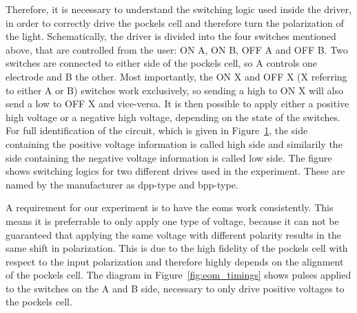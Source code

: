 Therefore, it is necessary to understand the switching logic used inside the driver, in order to correctly drive the pockels cell and therefore turn the polarization of the light. Schematically, the driver is divided into the four switches mentioned above, that are controlled from the user: ON A, ON B, OFF A and OFF B. Two switches are connected to either side of the pockels cell, so A controls one electrode and B the other. Most importantly, the ON X and OFF X (X referring to either A or B) switches work exclusively, so sending a high to ON X will also send a low to OFF X and vice-versa. It is then possible to apply either a positive high voltage or a negative high voltage, depending on the state of the switches. For full identification of the circuit, which is given in Figure~\ref{fig:eom_driver_switches}, the side containing the positive voltage information is called high side and similarily the side containing the negative voltage information is called low side. The figure shows switching logics for two different drives used in the experiment. These are named by the manufacturer as dpp-type and bpp-type.

\begin{figure}[t]
\label{fig:eom_driver_switches}
\end{figure}

A requirement for our experiment is to have the \acp{eom} work consistently. This means it is preferrable to only apply one type of voltage, because it can not be guaranteed that applying the same voltage with different polarity results in the same shift in polarization. This is due to the high fidelity of the pockels cell with respect to the input polarization and therefore highly depends on the alignment of the pockels cell. The diagram in Figure~\ref{fig:eom_timings} shows pulses applied to the switches on the A and B side, necessary to only drive positive voltages to the pockels cell.


